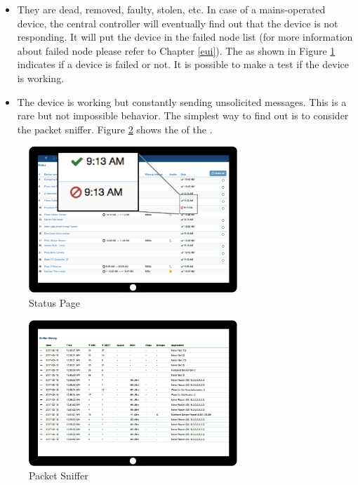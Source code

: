 \begin{itemize}
\item They are dead, removed, faulty, stolen, etc. In case of a mains-operated device, 
the central \zway controller  will eventually find out that the device is not responding. 
It will put the device in the failed node list (for more information about failed node 
please refer to Chapter \ref{eui}). The  as shown in 
Figure \ref{c5:citstatus} indicates if a device is failed or not.
It is possible to make a test if the device is working.
\item The device is working but constantly sending unsolicited messages. This is a rare 
but not impossible behavior. The simplest way to find out is to consider the packet 
sniffer. Figure \ref{c5:snifferpak} shows the  of the \zweui.
\end{itemize}

\begin{figure}
\begin{center}
\includegraphics[width=0.7\textwidth]{pngs/cap8/c5networkstatus.png}
\caption{Status Page \zway}

\label{c5:citstatus}
\end{center}
\end{figure}


\begin{figure}
\begin{center}
\includegraphics[width=0.7\textwidth]{pngs/cap8/c5sniffer.png}
\caption{Packet Sniffer}
\label{c5:snifferpak}
\end{center}
\end{figure}

